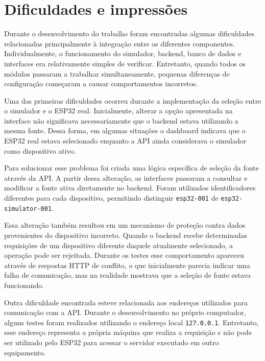 \vspace{5mm}
\section{Dificuldades e impressões}
\label{sec:dificuldades}

Durante o desenvolvimento do trabalho foram encontradas algumas dificuldades relacionadas principalmente à integração entre os diferentes componentes. Individualmente, o funcionamento do simulador, backend, banco de dados e interfaces era relativamente simples de verificar. Entretanto, quando todos os módulos passaram a trabalhar simultaneamente, pequenas diferenças de configuração começaram a causar comportamentos incorretos.

Uma das primeiras dificuldades ocorreu durante a implementação da seleção entre o simulador e o ESP32 real. Inicialmente, alterar a opção apresentada na interface não significava necessariamente que o backend estava utilizando a mesma fonte. Dessa forma, em algumas situações o dashboard indicava que o ESP32 real estava selecionado enquanto a API ainda considerava o simulador como dispositivo ativo.

Para solucionar esse problema foi criada uma lógica específica de seleção da fonte através da API. A partir dessa alteração, as interfaces passaram a consultar e modificar a fonte ativa diretamente no backend. Foram utilizados identificadores diferentes para cada dispositivo, permitindo distinguir \texttt{esp32-001} de \texttt{esp32-simulator-001}.

Essa alteração também resultou em um mecanismo de proteção contra dados provenientes do dispositivo incorreto. Quando o backend recebe determinadas requisições de um dispositivo diferente daquele atualmente selecionado, a operação pode ser rejeitada. Durante os testes esse comportamento apareceu através de respostas HTTP de conflito, o que inicialmente parecia indicar uma falha de comunicação, mas na realidade mostrava que a seleção de fonte estava funcionando.

Outra dificuldade encontrada esteve relacionada aos endereços utilizados para comunicação com a API. Durante o desenvolvimento no próprio computador, alguns testes foram realizados utilizando o endereço local \texttt{127.0.0.1}. Entretanto, esse endereço representa a própria máquina que realiza a requisição e não pode ser utilizado pelo ESP32 para acessar o servidor executado em outro equipamento.

